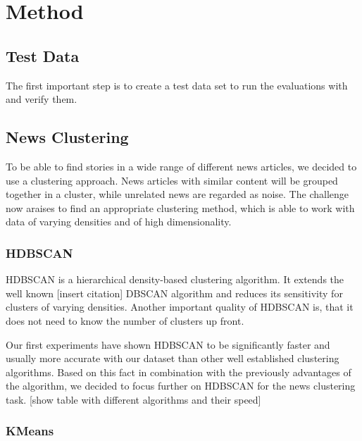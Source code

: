 \section{Method}



\subsection{Test Data}

The first important step is to create a test data set to run the evaluations with and verify them.


\subsection{News Clustering}

To be able to find stories in a wide range of different news articles, we decided to use a clustering approach. News articles with similar content will be grouped together in a cluster, while unrelated news are regarded as noise. The challenge now araises to find an appropriate clustering method, which is able to work with data of varying densities and of high dimensionality.

\subsubsection{HDBSCAN}

HDBSCAN is a hierarchical density-based clustering algorithm. It extends the well known [insert citation] DBSCAN algorithm and reduces its sensitivity for clusters of varying densities. Another important quality of HDBSCAN is, that it does not need to know the number of clusters up front.


Our first experiments have shown HDBSCAN to be significantly faster and usually more accurate with our dataset than other well established clustering algorithms. Based on this fact in combination with the previously advantages of the algorithm, we decided to focus further on HDBSCAN for the news clustering task.
[show table with different algorithms and their speed]

\subsubsection{KMeans}

